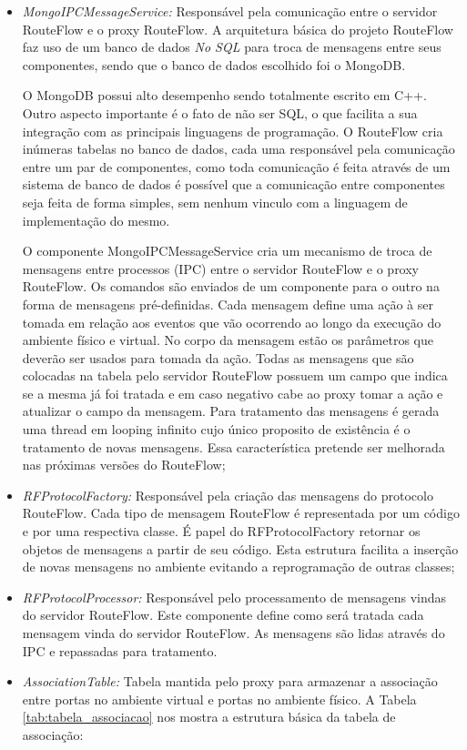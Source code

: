 \begin{itemize}
\item \textit{MongoIPCMessageService:} Responsável pela
 comunicação entre o servidor RouteFlow e o proxy 
RouteFlow. A arquitetura básica do projeto RouteFlow 
faz uso de um banco de dados \textit{No SQL} para troca de 
mensagens entre seus componentes, sendo que o banco 
de dados escolhido foi o MongoDB. 

O MongoDB possui 
alto desempenho sendo totalmente escrito em C++. Outro
 aspecto importante é o fato de não ser SQL, o 
que facilita a sua integração com as  principais linguagens
 de programação. 
O RouteFlow cria inúmeras tabelas no banco de dados, cada uma 
responsável pela comunicação entre um par 
de componentes, como toda comunicação é feita através de um 
sistema de banco de dados é possível que a 
comunicação entre componentes seja feita de forma simples, sem 
nenhum vinculo com a linguagem de 
implementação do mesmo. 

O componente MongoIPCMessageService 
cria um mecanismo de troca de mensagens entre processos (IPC) 
entre o servidor RouteFlow e o proxy RouteFlow. Os comandos são 
enviados de um componente para o outro 
na forma de mensagens pré-definidas. Cada mensagem define uma 
ação à ser tomada em relação aos eventos 
que vão ocorrendo ao longo da execução do ambiente físico e virtual. No corpo da 
mensagem estão os parâmetros que 
deverão ser usados para tomada da ação. Todas as mensagens que 
são colocadas na tabela pelo servidor RouteFlow 
possuem um campo que indica se a mesma já foi tratada e em caso 
negativo cabe ao proxy tomar a ação e 
atualizar o campo da mensagem. Para tratamento das mensagens é 
gerada uma thread em looping infinito 
cujo único proposito de existência é o tratamento de novas mensagens. 
Essa característica pretende ser melhorada nas próximas versões 
do RouteFlow;
\item \textit{RFProtocolFactory:} Responsável pela criação das 
mensagens do protocolo RouteFlow. Cada 
tipo de mensagem RouteFlow é representada por um código e 
por uma respectiva classe. É papel do 
RFProtocolFactory retornar os objetos de mensagens a partir de 
seu código. Esta estrutura facilita a 
inserção de novas mensagens no ambiente evitando a reprogramação 
de outras classes;
\item \textit{RFProtocolProcessor:} Responsável pelo processamento 
de mensagens vindas do servidor 
RouteFlow. Este componente define como será tratada cada mensagem 
vinda do servidor RouteFlow. As 
mensagens são lidas através do IPC e repassadas para tratamento.
\item \textit{AssociationTable:} Tabela mantida pelo proxy para armazenar 
a associação entre portas no 
ambiente virtual e portas no ambiente físico. A Tabela \ref{tab:tabela_associacao} nos 
mostra a estrutura básica da tabela de associação:


\end{itemize}
